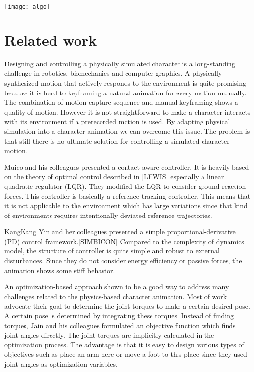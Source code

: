 \documentclass[a4paper,10pt]{article}
\begin{document}
\texttt{[image: algo]}
\pagebreak

\section{Related work}
Designing and controlling a physically simulated character is a long-standing
challenge in robotics, biomechanics and computer graphics. A physically
synthesized motion that actively responds to the environment is quite
promising because it is hard to keyframing a natural animation for every motion
manually. The combination of motion capture sequence and manual keyframing
shows a quality of motion. However it is not straightforward to make a character 
interacts with its environment if a prerecorded motion is used.
By adapting physical simulation into a character animation we can overcome
this issue. The problem is that still there is no ultimate solution for controlling
a simulated character motion.

Muico and his colleagues presented a contact-aware controller. It is
heavily based on the theory of optimal control described in [LEWIS]
especially a linear quadratic regulator (LQR). They modified the LQR
to consider ground reaction forces. This controller is basically
a reference-tracking controller. This means that it is not applicable
to the environment which has large variations since that kind of environments
requires intentionally deviated reference trajectories.

KangKang Yin and her colleagues presented a simple proportional-derivative (PD) control framework.[SIMBICON]
Compared to the complexity of dynamics model, the structure of controller
is quite simple and robust to external disturbances. Since they do not
consider energy efficiency or passive forces, the animation shows some
stiff behavior.

An optimization-based approach shown to be a good way to address many challenges
related to the physics-based character animation. Most of work advocate
their goal to determine the joint torques to make a certain desired pose.
A certain pose is determined by integrating these torques.
Instead of finding torques, Jain and his colleagues formulated
an objective function which finds joint angles directly. The joint torques
are implicitly calculated in the optimization process. The advantage is
that it is easy to design various types of objectives such as place an arm here
or move a foot to this place since they used joint angles as optimization
variables.
\end{document}
